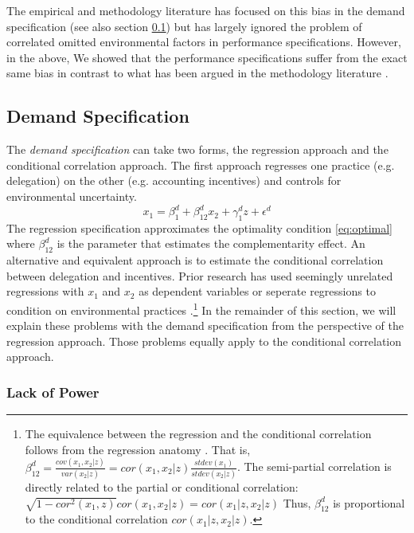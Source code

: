 \documentclass[12pt]{article}
\begin{document}
The empirical and methodology literature has focused on this bias in the demand specification (see also section \ref{demand-specification}) but has largely ignored the problem of correlated omitted environmental factors in performance specifications. However, in the above, We showed that the performance specifications suffer from the exact same bias in contrast to what has been argued in the methodology literature \citep{carree_note_2011}. 

\subsection{Demand Specification}\label{demand-specification}

The \emph{demand specification} can take two forms, the regression approach and the conditional correlation approach. The first approach regresses one practice (e.g. delegation) on the other (e.g. accounting incentives) and controls for environmental uncertainty.
\begin{equation*} 
x_1 = \beta_1^d + \beta_{12}^d x_2 
        + \gamma_{1}^d z
        + \epsilon^d
\end{equation*}
The regression specification approximates the optimality condition \eqref{eq:optimal} where \(\beta^d_{12}\) is the parameter that estimates the complementarity effect. An alternative and equivalent approach is to estimate the conditional correlation between delegation and incentives. Prior research has used seemingly unrelated regressions with $x_1$ and $x_2$ as dependent variables or seperate regressions to condition on environmental practices \citep{indjejikian_accounting_2012, matejka_balancing_2017}.\footnote{The equivalence between the regression and the conditional correlation follows from the regression anatomy \citep{angrist2008mostly}. That is, $\beta^d_{12}=\frac{cov(x_1, x_2|z)}{var (x_2|z)}=cor(x_1, x_2|z)\frac{stdev(x_1)}{stdev (x_2|z)}$. The semi-partial correlation is directly related to the partial or conditional correlation: $\sqrt{1 - cor^2(x_1, z)} cor(x_1, x_2|z) = cor(x_1|z, x_2|z)$
Thus, $\beta^d_{12}$ is proportional to the conditional correlation $cor(x_1|z, x_2|z)$.} In the remainder of this section, we will explain these problems with the demand specification from the perspective of the regression approach. Those problems equally apply to the conditional correlation approach.  

\subsubsection{Lack of Power}
\end{document}
